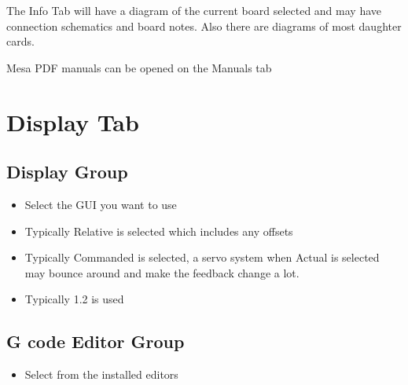 \documentclass[letterpaper,10pt,english,openany,oneside]{sphinxmanual}
\begin{document}
The Info Tab will have a diagram of the current board selected and may
have connection schematics and board notes. Also there are diagrams of
most daughter cards.


Mesa PDF manuals can be opened on the Manuals tab


\chapter{Display Tab}
\label{\detokenize{display:display-tab}}\label{\detokenize{display::doc}}


\section{Display Group}
\label{\detokenize{display:display-group}}\begin{itemize}
\item {} 
 \sphinxhyphen{} Select the GUI you want to use

\item {} 
 \sphinxhyphen{} Typically Relative is selected which includes any
offsets

\item {} 
 \sphinxhyphen{} Typically Commanded is selected, a servo system
when Actual is selected may bounce around and make the feedback change
a lot.

\item {} 
 \sphinxhyphen{} Typically 1.2 is used

\end{itemize}


\section{G code Editor Group}
\label{\detokenize{display:g-code-editor-group}}\begin{itemize}
\item {} 
 \sphinxhyphen{} Select from the installed editors

\end{itemize}
\end{document}
